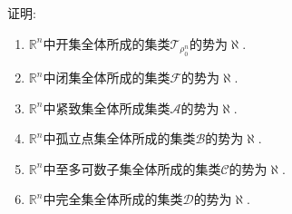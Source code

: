 \documentclass[../../main.tex]{subfiles}%
\begin{document}
\begin{proposition}
证明:
\begin{enumerate}[(1)]
\item $\mathbb{R}^n$中开集全体所成的集类$\mathscr{T}_{\rho_0^n}$的势为$\aleph$.
\item $\mathbb{R}^n$中闭集全体所成的集类$\mathscr{F}$的势为$\aleph$.
\item $\mathbb{R}^n$中紧致集全体所成集类$\mathscr{A}$的势为$\aleph$.
\item $\mathbb{R}^n$中孤立点集全体所成的集类$\mathscr{B}$的势为$\aleph$.
\item $\mathbb{R}^n$中至多可数子集全体所成的集类$\mathscr{C}$的势为$\aleph$.
\item $\mathbb{R}^n$中完全集全体所成的集类$\mathscr{D}$的势为$\aleph$.
\end{enumerate}
\end{proposition}
\end{document}

